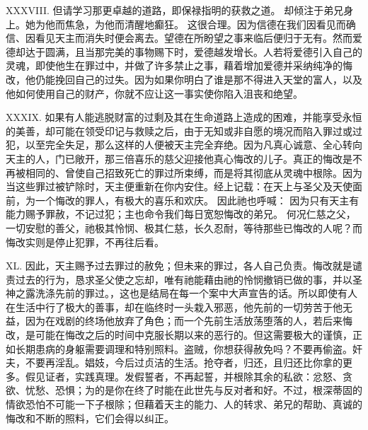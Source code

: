 XXXVIII. 但请学习那更卓越的道路，即保禄指明的获救之道。 却倾注于弟兄身上。她为他而焦急，为他而清醒地癫狂。     这很合理。因为信德在我们因看见而确信、因看见天主而消失时便会离去。望德在所盼望之事来临后便归于无有。然而爱德却达于圆满，且当那完美的事物赐下时，爱德越发增长。人若将爱德引入自己的灵魂，即使他生在罪过中，并做了许多禁止之事，藉着增加爱德并采纳纯净的悔改，他仍能挽回自己的过失。因为如果你明白了谁是那不得进入天堂的富人，以及他如何使用自己的财产，你就不应让这一事实使你陷入沮丧和绝望。\par

XXXIX. 如果有人能逃脱财富的过剩及其在生命道路上造成的困难，并能享受永恒的美善，却可能在领受印记与救赎之后，由于无知或非自愿的境况而陷入罪过或过犯，以至完全失足，那么这样的人便被天主完全弃绝。因为凡真心诚意、全心转向天主的人，门已敞开，那三倍喜乐的慈父迎接他真心悔改的儿子。真正的悔改是不再被相同的、曾使自己招致死亡的罪过所束缚，而是将其彻底从灵魂中根除。因为当这些罪过被铲除时，天主便重新在你内安住。经上记载：在天上与圣父及天使面前，为一个悔改的罪人，有极大的喜乐和欢庆。 因此祂也呼喊：      因为只有天主有能力赐予罪赦，不记过犯；主也命令我们每日宽恕悔改的弟兄。   何况仁慈之父，一切安慰的善父，祂极其怜悯、极其仁慈，长久忍耐，等待那些已悔改的人呢？而悔改实则是停止犯罪，不再往后看。\par

XL. 因此，天主赐予过去罪过的赦免；但未来的罪过，各人自己负责。悔改就是谴责过去的行为，恳求圣父使之忘却，唯有祂能藉由祂的怜悯撤销已做的事，并以圣神之露洗涤先前的罪过。，这也是结局在每一个案中大声宣告的话。所以即使有人在生活中行了极大的善事，却在临终时一头栽入邪恶，他先前的一切劳苦于他无益，因为在戏剧的终场他放弃了角色；而一个先前生活放荡堕落的人，若后来悔改，是可能在悔改之后的时间中克服长期以来的恶行的。但这需要极大的谨慎，正如长期患病的身躯需要调理和特别照料。盗贼，你想获得赦免吗？不要再偷盗。奸夫，不要再淫乱。娼妓，今后过贞洁的生活。抢夺者，归还，且归还比你拿的更多。假见证者，实践真理。发假誓者，不再起誓，并根除其余的私欲：忿怒、贪欲、忧愁、恐惧；为的是你在终了时能在此世先与反对者和好。不过，根深蒂固的情欲恐怕不可能一下子根除；但藉着天主的能力、人的转求、弟兄的帮助、真诚的悔改和不断的照料，它们会得以纠正。\par


